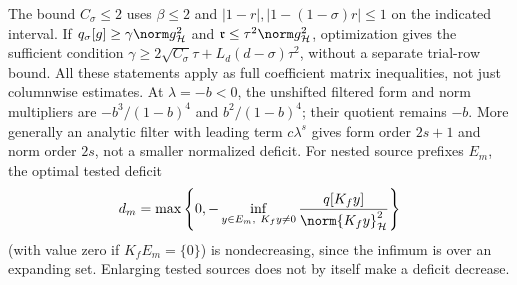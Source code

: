 \documentclass[11pt,a4paper]{article}
\numberwithin{equation}{section}
\theoremstyle{definition}\newtheorem{definition}[theorem]{Definition}
\theoremstyle{remark}\newtheorem{remark}[theorem]{Remark}
\newcommand{\Hh}{\mathcal H}\newcommand{\Hw}{\mathcal H}
\begin{document}
The bound $C_\sigma\le2$ uses $\beta\le2$ and
$|1-r|,|1-(1-\sigma)r|\le1$ on the indicated interval.
If $q_\sigma[g]\ge\gamma\norm g_{\Hh}^2$ and
$\mathfrak r\le\tau^2\norm g_{\Hh}^2$, optimization gives the sufficient
condition $\gamma\ge2\sqrt{C_\sigma}\tau+L_d(d-\sigma)\tau^2$,
without a separate trial-row bound. All these statements apply as full
coefficient matrix inequalities, not just columnwise estimates.
At $\lambda=-b<0$, the unshifted filtered form and norm multipliers are
$-b^3/(1-b)^4$ and $b^2/(1-b)^4$; their quotient remains $-b$.
More generally an analytic filter with leading term $c\lambda^s$ gives
form order $2s+1$ and norm order $2s$, not a smaller normalized deficit.
For nested source prefixes $E_m$, the optimal tested deficit
\[
 d_m=\max\left\{0,-\inf_{y\in E_m,\ K_fy\ne0}
                   {q[K_fy]\over\norm{K_fy}_{\Hh}^2}\right\}
\]
(with value zero if $K_fE_m=\{0\}$) is nondecreasing, since the infimum
is over an expanding set. Enlarging tested sources does not by itself
make a deficit decrease.
\end{document}
